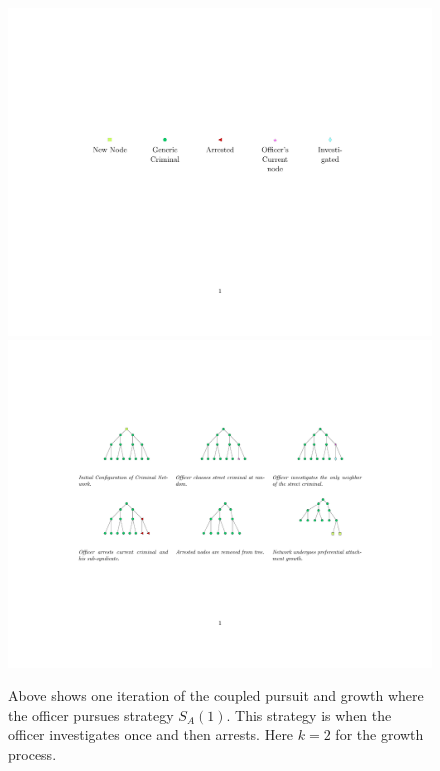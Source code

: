 \documentclass[%
 reprint,
 amsmath,amssymb,
 aps,
]{revtex4-1}
\theoremstyle{plain}
\theoremstyle{definition}
\begin{document}
\begin{figure}\centering
\includegraphics[width = .7\textwidth]{Key.pdf}
\includegraphics[width = \textwidth]{PursuitEvolution.pdf}
\caption{Above shows one iteration of the coupled pursuit and growth where the officer pursues strategy $S_A(1)$.  This strategy is when the officer investigates once and then arrests.  Here $k = 2$ for the growth process. }
\label{pe}
\end{figure}\\
\\
\end{document}
